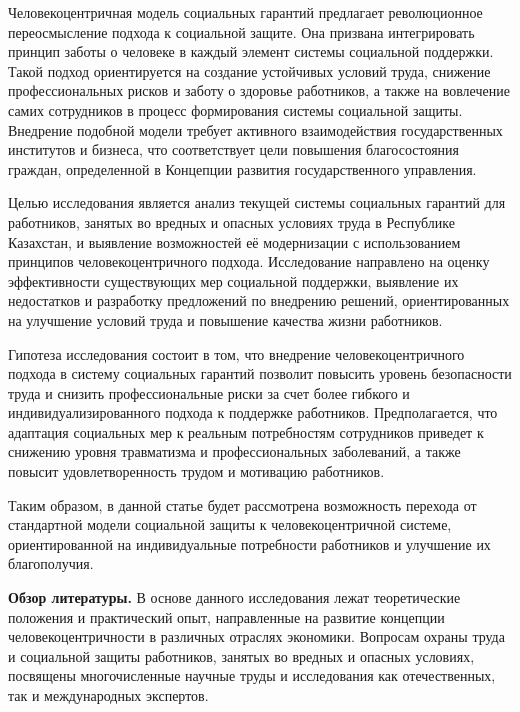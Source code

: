 \begin{multicols}{2}
Человекоцентричная модель социальных гарантий предлагает революционное
переосмысление подхода к социальной защите. Она призвана интегрировать
принцип заботы о человеке в каждый элемент системы социальной поддержки.
Такой подход ориентируется на создание устойчивых условий труда,
снижение профессиональных рисков и заботу о здоровье работников, а также
на вовлечение самих сотрудников в процесс формирования системы
социальной защиты. Внедрение подобной модели требует активного
взаимодействия государственных институтов и бизнеса, что соответствует
цели повышения благосостояния граждан, определенной в Концепции развития
государственного управления.

Целью исследования является анализ текущей системы социальных гарантий
для работников, занятых во вредных и опасных условиях труда в Республике
Казахстан, и выявление возможностей её модернизации с использованием
принципов человекоцентричного подхода. Исследование направлено на оценку
эффективности существующих мер социальной поддержки, выявление их
недостатков и разработку предложений по внедрению решений,
ориентированных на улучшение условий труда и повышение качества жизни
работников.

Гипотеза исследования состоит в том, что внедрение человекоцентричного
подхода в систему социальных гарантий позволит повысить уровень
безопасности труда и снизить профессиональные риски за счет более
гибкого и индивидуализированного подхода к поддержке работников.
Предполагается, что адаптация социальных мер к реальным потребностям
сотрудников приведет к снижению уровня травматизма и профессиональных
заболеваний, а также повысит удовлетворенность трудом и мотивацию
работников.

Таким образом, в данной статье будет рассмотрена возможность перехода от
стандартной модели социальной защиты к человекоцентричной системе,
ориентированной на индивидуальные потребности работников и улучшение их
благополучия.

{\bfseries Обзор литературы.} В основе данного исследования лежат
теоретические положения и практический опыт, направленные на развитие
концепции человекоцентричности в различных отраслях экономики. Вопросам
охраны труда и социальной защиты работников, занятых во вредных и
опасных условиях, посвящены многочисленные научные труды и исследования
как отечественных, так и международных экспертов.


\end{multicols}
